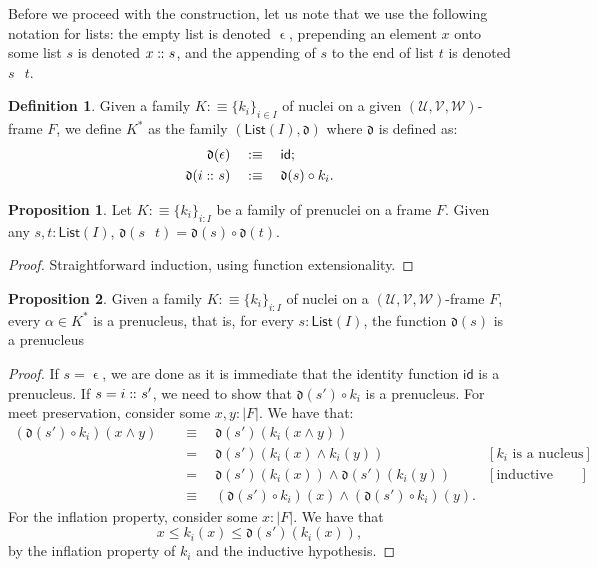 \documentclass[a4paper, 11pt]{article}
\theoremstyle{definition}
\newtheorem{prop}{Proposition}
\newtheorem{defn}{Definition}
\DeclareMathOperator{\emptyl}{\epsilon}
\DeclareMathOperator{\cons}{\colon\kern-1.1ex\colon\kern-0.4ex}
\DeclareMathOperator{\append}{\,}
\newcommand{\UU}{\mathcal{U}}
\newcommand{\VV}{\mathcal{V}}
\newcommand{\WW}{\mathcal{W}}
\newcommand{\dd}[1]{\mathfrak{d}(#1)}
\newcommand{\define}[1]{\emph{#1}}
\begin{document}
Before we proceed with the construction, let us note that we use the following notation for lists:
the empty list is denoted $\emptyl$, prepending an element $x$ onto some list $s$ is denoted $x
\cons s$, and the appending of $s$ to the end of list $t$ is denoted $s \append t$.

\begin{defn}
  Given a family $K :\equiv \{ k_i \}_{i \in I}$ of nuclei on a given $(\UU, \VV, \WW)$-frame $F$, we
  define \define{$K^*$} as the family $(\mathsf{List}(I), \mathfrak{d})$ where $\mathfrak{d}$ is
  defined as:
  \begin{align*}
    \dd{\emptyl}   \quad&:\equiv\quad \mathsf{id};  \\
    \dd{i \cons s} \quad&:\equiv\quad \dd{s} \circ k_i.
  \end{align*}
\end{defn}

\begin{prop}\label{prop:app-lemma}
  Let $K :\equiv \{ k_i \}_{i : I}$ be a family of prenuclei on a frame $F$. Given
  any $s, t : \mathsf{List}(I)$,
  \(\dd{s \append t} = \dd{s} \circ \dd{t}.\)
\end{prop}
\begin{proof}
  Straightforward induction, using function extensionality.
\end{proof}

\begin{prop}\label{prop:star-prenucleus}
  Given a family $K :\equiv \{ k_i \}_{i : I}$ of nuclei on a $(\UU, \VV, \WW)$-frame $F$, every $\alpha \in
  K^*$ is a prenucleus, that is, for every $s : \mathsf{List}(I)$, the function $\dd{s}$
  is a prenucleus
\end{prop}
\begin{proof}
  If $s = \emptyl$, we are done as it is immediate that the identity function $\mathsf{id}$ is a
  prenucleus. If $s = i \cons s'$, we need to show that $\dd{s'} \circ k_i$ is a prenucleus. For meet
  preservation, consider some $x, y : | F |$. We have that:
  \begin{align*}
    (\dd{s'} \circ k_i)(x \wedge y)
      &\quad\equiv\quad \dd{s'}(k_i(x \wedge y))                                                       \\
      &\quad=\quad \dd{s'}(k_i(x) \wedge k_i(y))                  & [\text{$k_i$ is a nucleus}]   \\
      &\quad=\quad \dd{s'}(k_i(x)) \wedge \dd{s'}(k_i(y))        & [\text{inductive hypothesis}] \\
      &\quad\equiv\quad (\dd{s'} \circ k_i)(x) \wedge (\dd{s'} \circ k_i)(y).
  \end{align*}
  For the inflation property, consider some $x : | F |$. We have that
  \begin{equation*}
    x \le k_i(x) \le \dd{s'}(k_i(x)),
  \end{equation*}
  by the inflation property of $k_i$ and the inductive hypothesis.
\end{proof}
\end{document}
